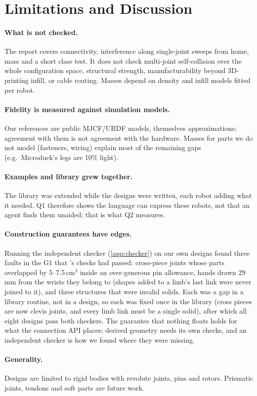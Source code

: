 \section{Limitations and Discussion}
\label{sec:discussion}

\paragraph{What is not checked.} The report covers connectivity, interference along single-joint
sweeps from home, mass and a short class test. It does not check multi-joint self-collision over
the whole configuration space, structural strength, manufacturability beyond 3D-printing infill,
or cable routing. Masses depend on density and infill models fitted per robot.

\paragraph{Fidelity is measured against simulation models.} Our references are public MJCF/URDF
models, themselves approximations; agreement with them is not agreement with the hardware. Masses
for parts we do not model (fasteners, wiring) explain most of the remaining gaps (e.g.\ Microduck's
legs are 10\% light).

\paragraph{Examples and library grew together.} The library was extended while the designs were
written, each robot adding what it needed. Q1 therefore shows the
language can express these robots, not that an agent finds them unaided; that is what Q2 measures.

\paragraph{Construction guarantees have edges.} Running the independent checker
(\cref{app:checker}) on our own designs found three faults in the G1 that \ms's checks had passed:
cross-piece joints whose parts overlapped by 5--7.5\,cm$^3$ inside an over-generous pin allowance,
hands drawn 29\,mm from the wrists they belong to (shapes added to a limb's last link were never
joined to it), and three structures that were invalid solids. Each was a gap in a library routine,
not in a design, so each was fixed once in the library (cross pieces are now clevis joints, and
every limb link must be a single solid), after which all eight designs pass both checkers. The
guarantee that nothing floats holds for what the connection API places; derived geometry needs
its own checks, and an independent checker is how we found where they were missing.

\paragraph{Generality.} Designs are limited to rigid bodies with revolute joints, pins and rotors.
Prismatic joints, tendons and soft parts are future work.
